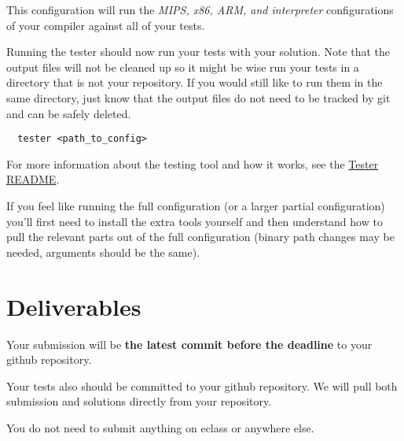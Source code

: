 \documentclass{article}
\begin{document}
This configuration will run the \textit{MIPS, x86, ARM, and interpreter} configurations of your
compiler against all of your tests.

Running the tester should now run your tests with your solution. Note that the output files will
not be cleaned up so it might be wise run your tests in a directory that is not your repository. If
you would still like to run them in the same directory, just know that the output files do not need
to be tracked by git and can be safely deleted.
\begin{lstlisting}
  tester <path_to_config>
\end{lstlisting}

For more information about the testing tool and how it works, see the
\href{https://github.com/cmput415/Tester/blob/master/README.md}{Tester README}.

If you feel like running the full configuration (or a larger partial configuration) you'll first
need to install the extra tools yourself and then understand how to pull the relevant parts out of
the full configuration (binary path changes may be needed, arguments should be the same).

\section{Deliverables}
Your submission will be \textbf{the latest commit before the deadline} to your github repository.

Your tests also should be committed to your github repository. We will pull both submission and
solutions directly from your repository.

You do not need to submit anything on eclass or anywhere else.
\end{document}
